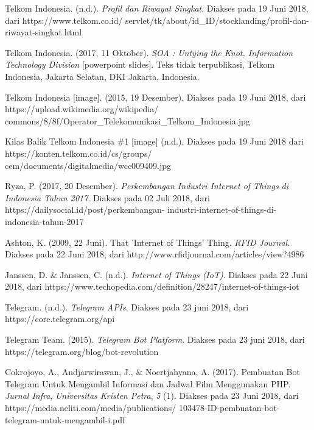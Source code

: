 \begin{thebibliography}{9}
	
	Telkom Indonesia. (n.d.). \textit{Profil dan Riwayat Singkat}. Diakses pada 19 Juni 2018, dari  https://www.telkom.co.id/ servlet/tk/about/id\_ID/stocklanding/profil-dan-riwayat-singkat.html
	
	Telkom Indonesia. (2017, 11 Oktober). \textit{SOA : Untying the Knot, Information Technology Division} [powerpoint slides]. Teks tidak terpublikasi, Telkom Indonesia, Jakarta Selatan, DKI Jakarta, Indonesia. 
	

	Telkom Indonesia [image]. (2015, 19 Desember). Diakses pada 19 Juni 2018, dari https://upload.wikimedia.org/wikipedia/ commons/8/8f/Operator\_Telekomunikasi\_Telkom\_Indonesia.jpg
	

	Kilas Balik Telkom Indonesia \#1 [image] (n.d.). Diakses pada 19 Juni 2018 dari https://konten.telkom.co.id/cs/groups/ cem/documents/digitalmedia/wcc009409.jpg
	
	Ryza, P. (2017, 20 Desember). 
	\textit{Perkembangan Industri Internet of Things di Indonesia Tahun 2017}. Diakses pada 02 Juli 2018, dari https://dailysocial.id/post/perkembangan- industri-internet-of-things-di-indonesia-tahun-2017

	Ashton, K. (2009, 22 Juni). That 'Internet of Things' Thing. \textit{RFID Journal}. Diakses pada 22 Juni 2018, dari http://www.rfidjournal.com/articles/view?4986
	
	Janssen, D. \& Janssen, C. (n.d.). \textit{Internet of Things (IoT)}. Diakses pada 22 Juni 2018, dari https://www.techopedia.com/definition/28247/internet-of-things-iot
	

	Telegram. (n.d.). \textit{Telegram APIs}. Diakses pada 23 juni 2018, dari https://core.telegram.org/api
	

	Telegram Team. (2015). \textit{Telegram Bot Platform}. Diakses pada 23 juni 2018, dari https://telegram.org/blog/bot-revolution
	

	Cokrojoyo, A., Andjarwirawan, J., \&  Noertjahyana, A. (2017). Pembuatan Bot Telegram Untuk Mengambil Informasi dan Jadwal Film Menggunakan PHP. \textit{Jurnal Infra}, \textit{Universitas Kristen Petra}, \textit{5} (1). Diakses pada 23 Juni 2018, dari https://media.neliti.com/media/publications/ 103478-ID-pembuatan-bot-telegram-untuk-mengambil-i.pdf
	
\end{thebibliography}
